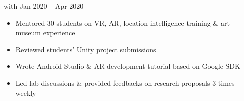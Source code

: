     {{\bodyfontsize \color{body} with} }
    {Jan 2020 -- Apr 2020}
    {}{}
\begin{itemize}
    \item Mentored 30 students on VR, AR, location intelligence training \& art museum experience

    \item Reviewed students' Unity project submissions

    \item Wrote Android Studio \& AR development tutorial based on Google SDK

    \item Led lab discussions \& provided feedbacks on research proposals 3 times weekly
\end{itemize}
\dividerSmall


